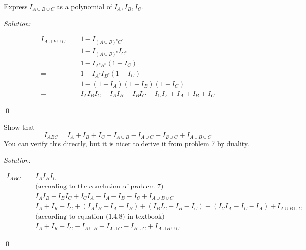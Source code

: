 \documentclass[12pt]{article}
\newenvironment{problem}[2][Problem]{\begin{trivlist}
\item[\hskip \labelsep {\bfseries #1}\hskip \labelsep {\bfseries #2.}]}{\end{trivlist}}
\newenvironment{sol}
    {\emph{Solution:}
    }
    {
    \qed
    }
\begin{document}
\begin{problem}{7}
Express $I_{A\cup B\cup C}$ as a polynomial of $I_A, I_B, I_C$.
\end{problem}
\begin{sol}
\begin{align*}
I_{A\cup B\cup C}=&1-I_{(A\cup B)^cC^c}\\
=&1-I_{(A\cup B)^c}I_{C^c}\\
=&1-I_{A^cB^c}(1-I_C)\\
=&1-I_{A^c}I_{B^c}(1-I_C)\\
=&1-(1-I_A)(1-I_B)(1-I_C)\\
=&I_AI_BI_C-I_AI_B-I_BI_C-I_CI_A+I_A+I_B+I_C
\end{align*}
\end{sol}



\begin{problem}{8}
Show that 
\[I_{ABC}=I_A+I_B+I_C-I_{A\cup B}-I_{A\cup C}-I_{B\cup C}+I_{A\cup B\cup C}\]
You can verify this directly, but it is nicer to derive it from problem 7 by duality.
\end{problem}
\begin{sol}
\begin{align*}
I_{ABC}=&I_AI_BI_C\\
&\text{(according to the conclusion of problem 7)}\\
=&I_AI_B+I_BI_C+I_CI_A-I_A-I_B-I_C+I_{A\cup B\cup C}\\
=&I_A+I_B+I_C+(I_AI_B-I_A-I_B)+(I_BI_C-I_B-I_C)+(I_CI_A-I_C-I_A)+I_{A\cup B\cup C}\\
&\text{(according to equation (1.4.8) in textbook)}\\
=&I_A+I_B+I_C-I_{A\cup B}-I_{A\cup C}-I_{B\cup C}+I_{A\cup B\cup C}
\end{align*}
\end{sol}
\end{document}
